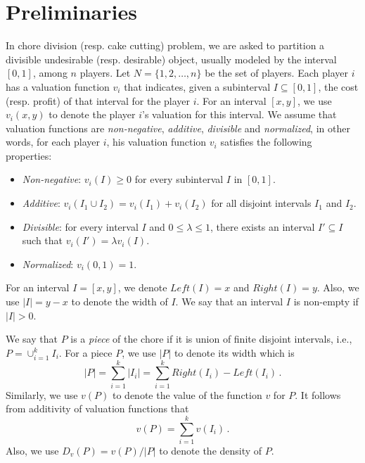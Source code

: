 \section{Preliminaries}
In chore division (resp. cake cutting) problem, we are asked to partition a divisible undesirable (resp. desirable) object, usually modeled by the interval $[0,1]$, among $n$ players. Let $N = \{1,2,\ldots,n\}$ be the set of players. Each player $i$ has a valuation function $v_i$ that indicates, given a subinterval $I\subseteq [0,1]$, the cost (resp. profit) of that interval for the player $i$.
For an interval $[x,y]$, we use $v_i(x,y)$ to denote the player $i$'s valuation for this interval. We assume that valuation functions are \textit{non-negative}, \textit{additive}, \textit{divisible} and \textit{normalized}, in other words, for each player $i$, his valuation function $v_i$ satisfies the following properties:
\begin{itemize}
\item \textit{Non-negative}: $v_i(I) \ge 0$ for every subinterval $I$ in $[0,1]$.
\item \textit{Additive}: $v_i(I_1 \cup I_2) = v_i(I_1) + v_i(I_2)$ for all disjoint intervals $I_1$ and $I_2$.
\item \textit{Divisible}: for every interval $I$ and $0 \le \lambda \le 1$, there exists an interval $I' \subseteq I$ such that $v_i(I')= \lambda v_i(I)$.
\item \textit{Normalized}: $v_i(0,1)=1$.
\end{itemize}

For an interval $I=[x,y]$, we denote $Left(I)=x$ and $Right(I)=y$. Also, we use $|I|=y-x$ to denote the width of $I$. We say that an interval $I$ is non-empty if $|I|>0$.

 We say that $P$ is a \textit{piece} of the chore if it is union of finite disjoint intervals, i.e., $P=\cup_{i=1}^{k} I_i$. For a piece $P$, we use $|P|$ to denote its width which is
$$
|P| = \sum_{i=1}^{k} |I_i| = \sum_{i=1}^{k} Right(I_i)-Left(I_i) \,.
$$
Similarly, we use $v(P)$ to denote the value of the function $v$ for $P$. It follows from additivity of valuation functions that
$$
v(P) = \sum_{i=1}^{k} v(I_i) \,.
$$
Also, we use $D_v(P)=v(P)/|P|$ to denote the density of $P$. 


